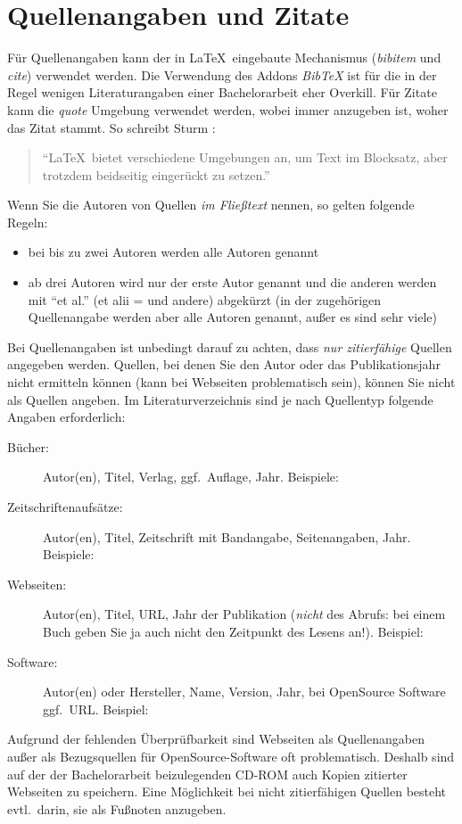 \documentclass[12pt]{article}
\begin{document}
\section{Quellenangaben und Zitate}
\label{sec:quellen}
Für Quellenangaben kann der in \LaTeX\ eingebaute Mechanismus 
({\em bibitem} und {\em cite}) verwendet
werden. Die Verwendung des Addons {\em BibTeX} ist für die in der Regel wenigen
Literaturangaben einer Bachelorarbeit eher Overkill. Für Zitate kann die
{\em quote} Umgebung verwendet werden, wobei immer anzugeben ist, woher
das Zitat stammt. So schreibt Sturm \cite{rrzn06}:
\begin{quote}
``\LaTeX\ bietet verschiedene Umgebungen an, um Text im Blocksatz, aber
trotzdem beidseitig eingerückt zu setzen.''
\end{quote}
Wenn Sie die Autoren von Quellen {\em im Fließtext} nennen, so gelten folgende
Regeln:
\begin{itemize}
\item bei bis zu zwei Autoren werden alle Autoren genannt
\item ab drei Autoren wird nur der erste Autor genannt und die anderen
  werden mit ``et al.'' (et alii = und andere) abgekürzt (in der zugehörigen
  Quellenangabe werden aber alle Autoren genannt, außer es sind sehr viele)
\end{itemize}
Bei Quellenangaben ist unbedingt darauf zu achten, dass {\em nur zitierfähige}
Quellen angegeben werden. Quellen, bei denen Sie den Autor oder das 
Publikationsjahr nicht ermitteln können (kann bei Webseiten problematisch
sein), können Sie nicht als Quellen angeben. Im Literaturverzeichnis sind
je nach Quellentyp folgende Angaben erforderlich:
\begin{description}
\item[Bücher:] Autor(en), Titel, Verlag, ggf.~Auflage, Jahr.
  Beispiele: \cite{kopka91} \cite{rrzn06}
\item[Zeitschriftenaufsätze:] Autor(en), Titel, Zeitschrift mit Bandangabe,
  Seitenangaben, Jahr. Beispiele: \cite{dalitz09} \cite{dalitz08}
\item[Webseiten:] Autor(en), Titel, URL, Jahr der Publikation ({\em nicht}
  des Abrufs: bei einem Buch geben Sie ja auch nicht den Zeitpunkt des Lesens
  an!). Beispiel: \cite{website}
\item[Software:] Autor(en) oder Hersteller, Name, Version, Jahr, bei
  OpenSource Software ggf.~URL. Beispiel: \cite{xfig}
\end{description}
Aufgrund der fehlenden Überprüfbarkeit sind Webseiten als Quellenangaben
außer als Bezugsquellen für OpenSource-Software oft problematisch.
Deshalb sind auf
der der Bachelorarbeit beizulegenden CD-ROM auch Kopien zitierter
Webseiten zu speichern. Eine Möglichkeit
bei nicht zitierfähigen Quellen besteht evtl.~darin, sie als Fußnoten
anzugeben.
\end{document}
